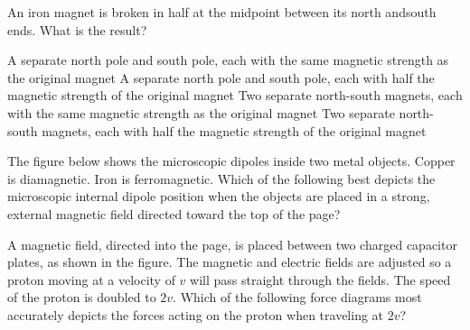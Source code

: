 \documentclass{../../../oss-ap12ibhl}
\begin{document}
\begin{questions}
  \question An iron magnet is broken in half at the midpoint between its north
  andsouth ends. What is the result?
  \begin{choices}
    \choice A separate north pole and south pole, each with the same
    magnetic strength as the original magnet
    \choice A separate north pole and south pole, each with half the magnetic
    strength of the original magnet 
    \choice Two separate north-south magnets, each with the same magnetic
    strength as the original magnet
    \choice Two separate north-south magnets, each with half the magnetic
    strength of the original magnet
  \end{choices}
  \vspace{.7in}

  \question The figure below shows the microscopic dipoles inside two metal
  objects. Copper is diamagnetic. Iron is ferromagnetic. Which of the following
  best depicts the microscopic internal dipole position when the objects
  are placed in a strong, external magnetic field directed toward the top
  of the page?

  \hspace{.3in}
    
  \question A magnetic field, directed into the page, is placed between two
  charged capacitor plates, as shown in the figure. The magnetic and electric
  fields are adjusted so a proton moving at a velocity of $v$ will pass straight
  through the fields. The speed of the proton is doubled to $2v$. Which of the
  following force diagrams most accurately depicts the forces acting on the
  proton when traveling at $2v$?

  \begin{minipage}{.25\linewidth}
  \end{minipage}
  \begin{minipage}{.5\linewidth}
    \begin{choices}
      \choice{}


\end{choices}
\end{minipage}
\end{questions}
\end{document}
